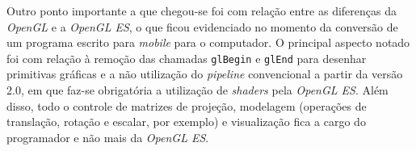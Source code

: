 	Outro ponto importante a que chegou-se foi com relação entre as diferenças da  \textit{OpenGL} e a  \textit{OpenGL ES}, o que ficou evidenciado no momento da conversão de um programa escrito para \textit{mobile} para o computador. O principal aspecto notado foi com relação à remoção das chamadas \texttt{glBegin} e \texttt{glEnd} para desenhar primitivas gráficas e a não utilização do \textit{pipeline} convencional a partir da versão 2.0, em que faz-se obrigatória a utilização de \textit{shaders} pela \textit{OpenGL ES}. Além disso, todo o controle de matrizes de projeção, modelagem (operações de translação, rotação e escalar, por exemplo) e visualização fica a cargo do programador e não mais da \textit{OpenGL ES}. 




